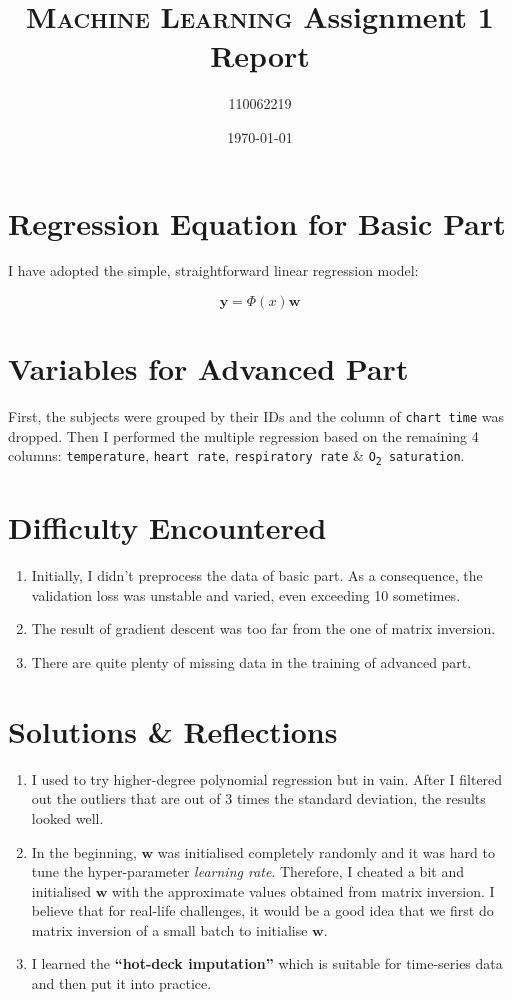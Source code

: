 \documentclass[12pt, a4paper]{article}
\title{\textsc{Machine Learning} Assignment 1 Report}
\author{110062219}
\date{\today}
\begin{document}
\maketitle

\section{Regression Equation for Basic Part}

I have adopted the simple, straightforward linear regression model:

$$\mathbf{y}=\Phi(x)\mathbf{w}$$

\section{Variables for Advanced Part}

First, the subjects were grouped by their IDs and the column of \texttt{chart time} was dropped. Then I performed the multiple regression based on the remaining 4 columns: \texttt{temperature}, \texttt{heart rate}, \texttt{respiratory rate} \& \texttt{O\textsubscript{2} saturation}.

\section{Difficulty Encountered}

\begin{enumerate}
\item Initially, I didn't preprocess the data of basic part. As a consequence, the validation loss was unstable and varied, even exceeding 10 sometimes.
\item The result of gradient descent was too far from the one of matrix inversion.
\item There are quite plenty of missing data in the training of advanced part.
\end{enumerate}

\section{Solutions \& Reflections}

\begin{enumerate}
\item I used to try higher-degree polynomial regression but in vain. After I filtered out the outliers that are out of 3 times the standard deviation, the results looked well.
\item In the beginning, $\mathbf{w}$ was initialised completely randomly and it was hard to tune the hyper-parameter \textit{learning rate}. Therefore, I cheated a bit and initialised $\mathbf{w}$ with the approximate values obtained from matrix inversion. I believe that for real-life challenges, it would be a good idea that we first do matrix inversion of a small batch to initialise $\mathbf{w}$.
\item I learned the \textbf{``hot-deck imputation''} which is suitable for time-series data and then put it into practice.
\end{enumerate}
\end{document}
